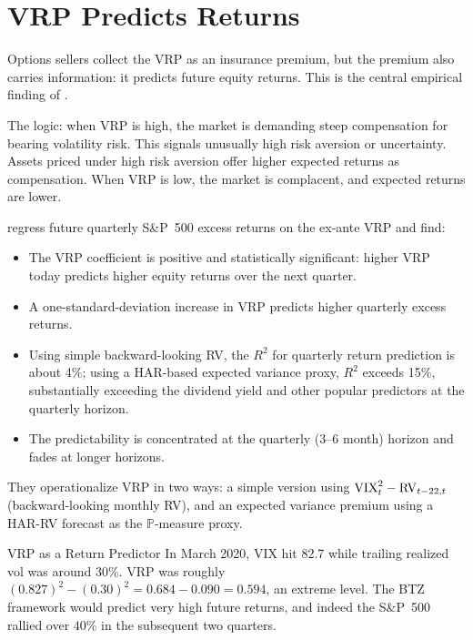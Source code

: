 \section{VRP Predicts Returns}
\label{sec:vrp-returns}

Options sellers collect the VRP as an insurance premium, but the premium also carries information: it predicts future equity returns.
This is the central empirical finding of \citet{BTZ2009}.

The logic: when VRP is high, the market is demanding steep compensation for bearing volatility risk.
This signals unusually high risk aversion or uncertainty.
Assets priced under high risk aversion offer higher expected returns as compensation.
When VRP is low, the market is complacent, and expected returns are lower.

\begin{keyresult}
\label{res:btz2009}
\citet{BTZ2009} regress future quarterly S\&P~500 excess returns on the ex-ante VRP and find:
\begin{itemize}[nosep]
  \item The VRP coefficient is positive and statistically significant: higher VRP today predicts higher equity returns over the next quarter.
  \item A one-standard-deviation increase in VRP predicts higher quarterly excess returns.
  \item Using simple backward-looking RV, the $R^2$ for quarterly return prediction is about 4\%; using a HAR-based expected variance proxy, $R^2$ exceeds 15\%, substantially exceeding the dividend yield and other popular predictors at the quarterly horizon.
  \item The predictability is concentrated at the quarterly (3--6 month) horizon and fades at longer horizons.
\end{itemize}
They operationalize VRP in two ways: a simple version using $\text{VIX}^2_t - \operatorname{RV}_{t-22,t}$ (backward-looking monthly RV), and an expected variance premium using a HAR-RV forecast as the $\mathbb{P}$-measure proxy.
\end{keyresult}

\begin{workedexample}{VRP as a Return Predictor}
In March 2020, VIX hit 82.7 while trailing realized vol was around 30\%.
VRP was roughly $(0.827)^2 - (0.30)^2 = 0.684 - 0.090 = 0.594$, an extreme level.
The BTZ framework would predict very high future returns, and indeed the S\&P~500 rallied over 40\% in the subsequent two quarters.
\end{workedexample}

